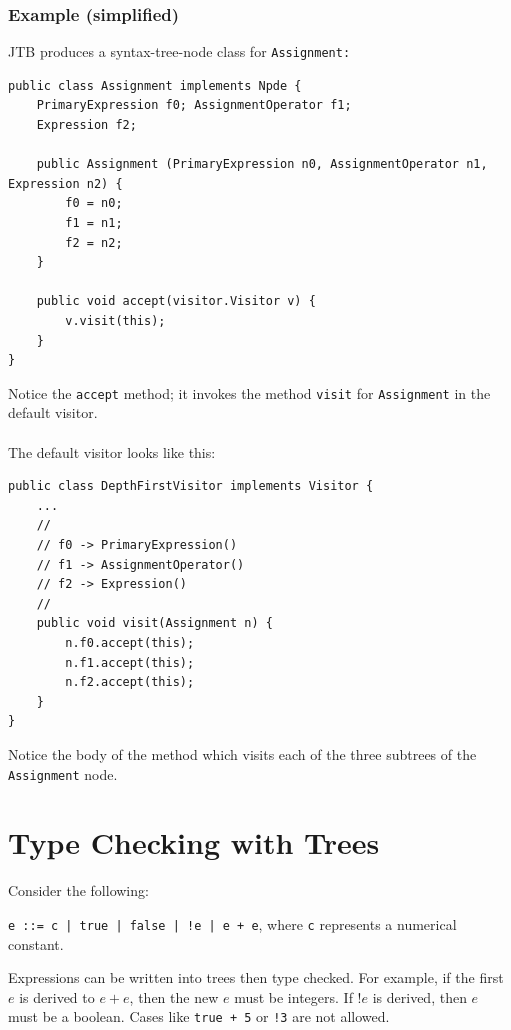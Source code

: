 \documentclass[10pt]{article}
\begin{document}
\subsubsection*{Example (simplified)}
JTB produces a syntax-tree-node class for \texttt{Assignment:}
\begin{verbatim}
public class Assignment implements Npde {
    PrimaryExpression f0; AssignmentOperator f1;
    Expression f2;

    public Assignment (PrimaryExpression n0, AssignmentOperator n1, Expression n2) {
        f0 = n0;
        f1 = n1;
        f2 = n2;
    }

    public void accept(visitor.Visitor v) {
        v.visit(this);
    }
}
\end{verbatim}
Notice the \texttt{accept} method; it invokes the method \texttt{visit} for \texttt{Assignment} in the default visitor.\\\\
The default visitor looks like this:
\begin{verbatim}
public class DepthFirstVisitor implements Visitor {
    ...
    //
    // f0 -> PrimaryExpression()
    // f1 -> AssignmentOperator()
    // f2 -> Expression()
    //
    public void visit(Assignment n) {
        n.f0.accept(this);
        n.f1.accept(this);
        n.f2.accept(this);
    }
}
\end{verbatim}
Notice the body of the method which visits each of the three subtrees of the \texttt{Assignment} node.

\section*{Type Checking with Trees}
Consider the following:
\begin{center}
    \texttt{e ::= c | true | false | !e | e + e}, where \texttt{c} represents a numerical constant.
\end{center}
Expressions can be written into trees then type checked.  For example, if the first $e$ is derived to $e + e$, then the new $e$ must be integers.  If $!e$ is derived, then $e$ must be a boolean.  Cases like \texttt{true + 5} or \texttt{!3} are not allowed.
\end{document}
